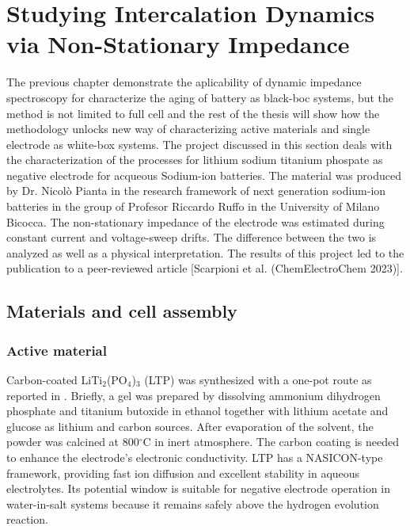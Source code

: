 \chapter{Studying Intercalation Dynamics via Non-Stationary Impedance}
\label{chap:LTP}

The previous chapter demonstrate the aplicability of dynamic impedance spectroscopy for characterize the aging of battery as black-boc systems, but the method is not limited to full cell and the rest of the thesis will show how the methodology unlocks new way of characterizing active materials and single electrode as white-box systems.
The project discussed in this section deals with the characterization of the processes for lithium sodium titanium phospate as negative electrode for acqueous Sodium-ion batteries. The material was produced by Dr. Nicolò Pianta in the research framework of next generation sodium-ion batteries in the group of Profesor Riccardo Ruffo in the University of Milano Bicocca. The non-stationary impedance of the electrode was estimated during constant current and voltage-sweep drifts. The difference between the two is analyzed as well as a physical interpretation. The results of this project led to the publication to a peer-reviewed article [Scarpioni et al. (ChemElectroChem 2023)].

\section{Materials and cell assembly}

\subsection{Active material}


Carbon-coated LiTi$_2$(PO$_4$)$_3$ (LTP) was synthesized with a one-pot route as reported in \cite{Scarpioni2023}. Briefly, a gel was prepared by dissolving ammonium dihydrogen phosphate and titanium butoxide in ethanol together with lithium acetate and glucose as lithium and carbon sources. After evaporation of the solvent, the powder was calcined at 800$^\circ$C in inert atmosphere. The carbon coating is needed to enhance the electrode's electronic conductivity. LTP has a NASICON-type framework, providing fast ion diffusion and excellent stability in aqueous electrolytes. Its potential window is suitable for negative electrode operation in water-in-salt systems because it remains safely above the hydrogen evolution reaction.

